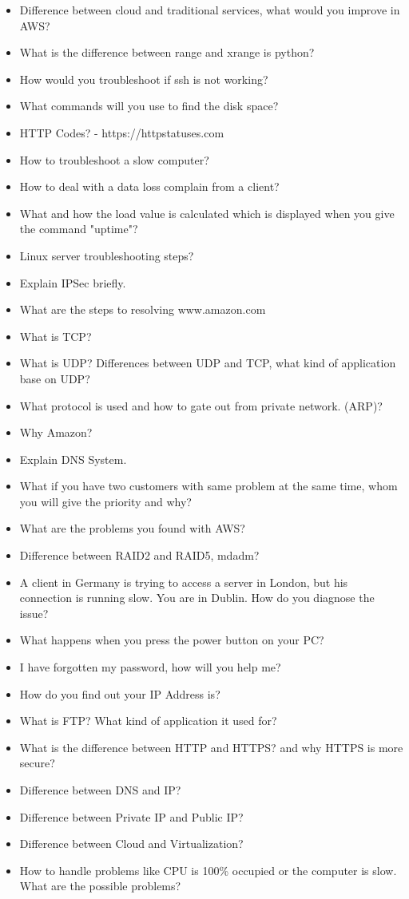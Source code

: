 \documentclass{article}
\begin{document}
\begin{itemize}
	\item Difference between cloud and traditional services, what would you improve in AWS?
	\item What is the difference between range and xrange is python?
	\item How would you troubleshoot if ssh is not working?
	\item What commands will you use to find the disk space?
	\item HTTP Codes? - https://httpstatuses.com
	\item How to troubleshoot a slow computer?
	\item How to deal with a data loss complain from a client?
	\item What and how the load value is calculated which is displayed when you give the command "uptime"?
	\item Linux server troubleshooting steps?
	\item Explain IPSec briefly.
	\item What are the steps to resolving www.amazon.com
	\item What is TCP?
	\item What is UDP? Differences between UDP and TCP, what kind of application base on UDP?
	\item What protocol is used and how to gate out from private network. (ARP)?
	\item Why Amazon?
	\item Explain DNS System.
	\item What if you have two customers with same problem at the same time, whom you will give the priority and why?
	\item What are the problems you found with AWS?
	\item Difference between RAID2 and RAID5, mdadm?
	\item A client in Germany is trying to access a server in London, but his connection is running slow. You are in Dublin. How do you diagnose the issue?
	\item What happens when you press the power button on your PC?
	\item I have forgotten my password, how will you help me?
	\item How do you find out your IP Address is?
	\item What is FTP? What kind of application it used for?
	\item What is the difference between HTTP and HTTPS? and why HTTPS is more secure?
	\item Difference between DNS and IP?
	\item Difference between Private IP and Public IP?
	\item Difference between Cloud and Virtualization?
	\item How to handle problems like CPU is 100\% occupied or the computer is slow. What are the possible problems?
	
\end{itemize}
\end{document}
